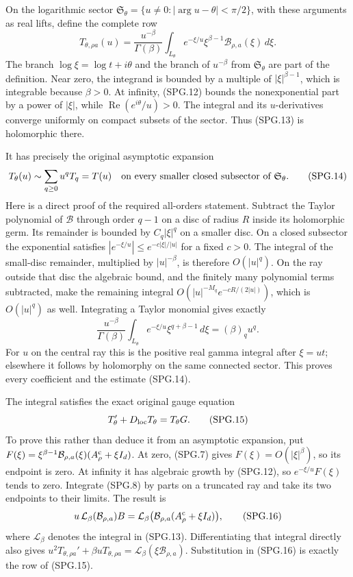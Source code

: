 On the logarithmic sector
\(\mathfrak S_\theta=\{u\ne0:|\arg u-\theta|<\pi/2\}\),
with these arguments as real lifts, define the complete row
\[
 T_{\theta,\rho a}(u)
  =\frac{u^{-\beta}}{\Gamma(\beta)}
       \int_{L_\theta} e^{-\xi/u}\xi^{\beta-1}
                         \mathcal B_{\rho,a}(\xi)\,d\xi.
 \tag{SPG.13}\label{GraphV2:eq:spg-Laplace}
\]
The branch \(\log\xi=\log t+i\theta\) and the branch of
\(u^{-\beta}\) from \(\mathfrak S_\theta\) are part of the
definition. Near zero, the integrand is bounded by a multiple of
\(|\xi|^{\beta-1}\), which is integrable because \(\beta>0\).
At infinity, (SPG.12) bounds the nonexponential part by a power of
\(|\xi|\), while
\(\operatorname{Re}(e^{i\theta}/u)>0\). The integral and its
\(u\)-derivatives converge uniformly on compact subsets of the
sector. Thus (SPG.13) is holomorphic there.

It has precisely the original asymptotic expansion
\[
 T_{\theta}(u)\sim\sum_{q\ge0}u^qT_q=T(u)
    \quad\hbox{on every smaller closed subsector of }
             \mathfrak S_\theta.
 \tag{SPG.14}\label{GraphV2:eq:spg-asymptotic}
\]
Here is a direct proof of the required all-orders statement. Subtract
the Taylor polynomial of \(\mathcal B\) through order \(q-1\)
on a disc of radius \(R\) inside its holomorphic germ. Its remainder
is bounded by \(C_q|\xi|^q\) on a smaller disc. On a closed
subsector the exponential satisfies
\(|e^{-\xi/u}|\le e^{-c|\xi|/|u|}\) for a fixed \(c>0\).
The integral of the small-disc remainder, multiplied by
\(|u|^{-\beta}\), is therefore \(O(|u|^q)\). On the ray
outside that disc the algebraic bound, and the finitely many
polynomial terms subtracted, make the remaining integral
\(O(|u|^{-M_q}e^{-cR/(2|u|)})\), which is \(O(|u|^q)\)
as well. Integrating a Taylor monomial gives exactly
\[
 \frac{u^{-\beta}}{\Gamma(\beta)}
     \int_{L_\theta}e^{-\xi/u}\xi^{q+\beta-1}\,d\xi
           =(\beta)_q u^q.
\]
For \(u\) on the central ray this is the positive real gamma
integral after \(\xi=ut\); elsewhere it follows by holomorphy
on the same connected sector. This proves every coefficient and
the estimate (SPG.14).

The integral satisfies the exact original gauge equation
\[
 T_\theta'+D_{\rm loc}T_\theta=T_\theta G.
 \tag{SPG.15}\label{GraphV2:eq:spg-exact-gauge}
\]
To prove this rather than deduce it from an asymptotic expansion,
put \(F(\xi)=\xi^{\beta-1}\mathcal B_{\rho,a}(\xi)
(A_\rho^{\rm c}+\xi I_d)\). At zero, (SPG.7) gives
\(F(\xi)=O(|\xi|^\beta)\), so its endpoint is zero. At infinity
it has algebraic growth by (SPG.12), so
\(e^{-\xi/u}F(\xi)\) tends to zero. Integrate (SPG.8) by
parts on a truncated ray and take its two endpoints to their limits.
The result is
\[
 u\,\mathcal L_\beta(\mathcal B_{\rho,a})B
       =\mathcal L_\beta\bigl(
                  \mathcal B_{\rho,a}(A_\rho^{\rm c}+\xi I_d)
                              \bigr),
 \tag{SPG.16}\label{GraphV2:eq:spg-integration-parts}
\]
where \(\mathcal L_\beta\) denotes the integral in (SPG.13).
Differentiating that integral directly also gives
\(u^2T_{\theta,\rho a}'+\beta uT_{\theta,\rho a}
       =\mathcal L_\beta(\xi\mathcal B_{\rho,a})\).
Substitution in (SPG.16) is exactly the row of (SPG.15).

